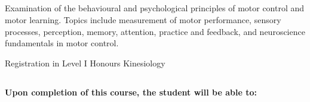 \documentclass[hidelinks,11pt]{article}
\begin{document}
\subsection*{{}}
Examination of the behavioural and psychological principles of motor control and motor learning. Topics include measurement of motor performance, sensory processes, perception, memory, attention, practice and feedback, and neuroscience fundamentals in motor control.

{} Registration in Level I Honours Kinesiology

\subsection*{{}}
\vspace{-0.75em}\subsubsection*{{}}
\vspace{-0.75em}\textbf{Upon completion of this course, the student will be able to:}
\end{document}
